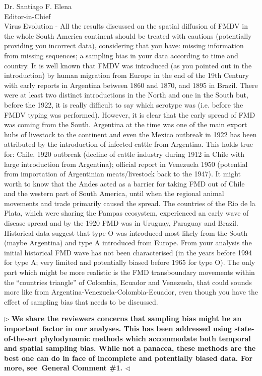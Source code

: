 \documentclass[ucla,biomath,12pt,noaddrfooter,datefrom]{UC_letter}
\newenvironment{reply}{$\triangleright$\bf}{$\triangleleft$}
\begin{document}
\begin{letter}{
Dr. Santiago F. Elena \\
Editor-in-Chief \\
Virus Evolution
}
-       All the results discussed on the spatial diffusion of FMDV in the whole South America continent should be treated with cautions (potentially providing you incorrect data), considering that you have: missing information from missing sequences; a sampling bias in your data according to time and country. 
It is well known that FMDV was introduced (as you pointed out in the introduction) by human migration from Europe in the end of the 19th Century with early reports in Argentina between 1860 and 1870, and 1895 in Brazil. 
There were at least two distinct introductions in the North and one in the South but, before the 1922, it is really difficult to say which serotype was (i.e. before the FMDV typing was performed). 
However, it is clear that the early spread of FMD was coming from the South. 
Argentina at the time was one of the main export hubs of livestock to the continent and even the Mexico outbreak in 1922 has been attributed by the introduction of infected cattle from Argentina. 
This holds true for: Chile, 1920 outbreak (decline of cattle industry during 1912 in Chile with large introduction from Argentina); official report in Venezuela 1950 (potential from importation of Argentinian meats/livestock back to the 1947). 
It might worth to know that the Andes acted as a barrier for taking FMD out of Chile and the western part of South America, until when the regional animal movements and trade primarily caused the spread. 
The countries of the Rio de la Plata, which were sharing the Pampas ecosystem, experienced an early wave of disease spread and by the 1920 FMD was in Uruguay, Paraguay and Brazil. 
Historical data suggest that type O was introduced most likely from the South (maybe Argentina) and type A introduced from Europe. 
From your analysis the initial historical FMD wave has not been characterised (in the years before 1994 for type A; very limited and potentially biased before 1965 for type O). 
The only part which might be more realistic is the FMD transboundary movements within the ``countries triangle'' of Colombia, Ecuador and Venezuela, that could sounds more like from Argentina-Venezuela-Colombia-Ecuador, even though you have the effect of sampling bias that needs to be discussed.

\begin{reply}
We share the reviewers concerns that sampling bias might be an important factor in our analyses.
This has been addressed using state-of-the-art phylodynamic methods which accommodate both temporal and spatial sampling bias.
While not a panacea, these methods are the best one can do in face of incomplete and potentially biased data.
For more, see~\textbf{General Comment \#1}.
\end{reply}


\end{letter}
\end{document}

